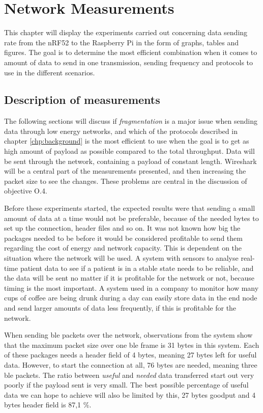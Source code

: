 \chapter{Network Measurements}
\label{chp:measurements2}


This chapter will display the experiments carried out concerning data sending rate from the \gls{nRF52} to the \gls{Raspberry Pi} in the form of graphs, tables and figures. The goal is to determine the most efficient combination when it comes to amount of data to send in one transmission, sending frequency and protocols to use in the different scenarios. 

\section{Description of measurements}

The following sections will discuss if \textit{fragmentation} is a major issue when sending data through low energy networks, and which of the protocols described in chapter \ref{chp:background}  is the most efficient to use when the goal is to get as high amount of \gls{payload} as possible compared to the total throughput. Data will be sent through the network, containing a payload of constant length. Wireshark will be a central part of the measurements presented, and then increasing the packet size to see the changes. These problems are central in the discussion of objective O.4. 

\noindent Before these experiments started, the expected results were that sending a small amount of data at a time would not be preferable, because of the needed bytes to set up the connection, header files and so on. It was not known how big the packages needed to be before it would be considered profitable to send them regarding the cost of energy and network capacity. This is dependent on the situation where the network will be used. A system with sensors to analyse real-time patient data to see if a patient is in a stable state needs to be reliable, and the data will be sent no matter if it is profitable for the network or not, because timing is the most important. A system used in a company to monitor how many cups of coffee are being drunk during a day can easily store data in the end node and send larger amounts of data less frequently, if this is profitable for the network. 

\noindent When sending \gls{ble} packets over the network, observations from the system show that the maximum packet size over one \gls{ble} frame is 31 bytes in this system. Each of these packages needs a header field of 4 bytes, meaning 27 bytes left for useful data. However, to start the connection at all, 76 bytes are needed, meaning three \gls{ble} packets. The ratio between \textit{useful} and \textit{needed} data transferred start out very poorly if the payload sent is very small. The best possible percentage of useful data we can hope to achieve will also be limited by this, 27 bytes \gls{goodput} and 4 bytes header field is 87,1 \%.  

